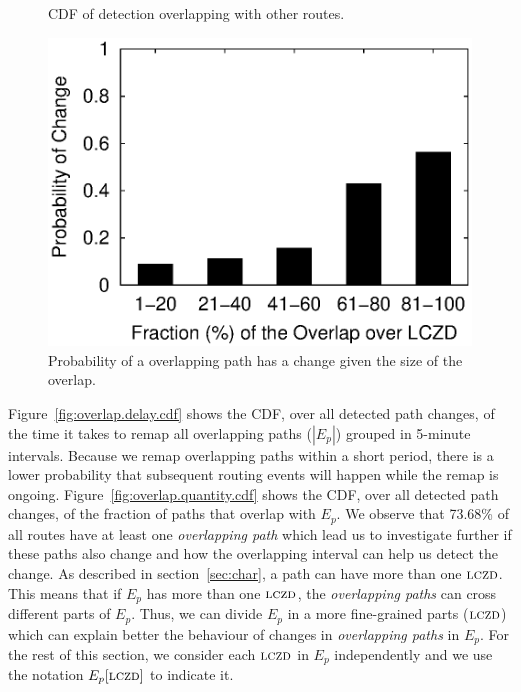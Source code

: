 \begin{figure}
\begin{minipage}{0.32\textwidth}
\caption{CDF of detection overlapping with other routes.}
\label{fig:overlap.quantity.cdf}
\end{minipage}
%
\hfill
\begin{minipage}{0.32\textwidth}
\includegraphics[width=1.05\columnwidth]{figs/patching/probchange/probchange.eps}
\caption{Probability of a overlapping path has a change given the size of the overlap.}
\label{fig:overlap.change.prob}
\end{minipage}
\end{figure}


Figure~\ref{fig:overlap.delay.cdf} shows the CDF, over all detected
path changes, of the time it takes to remap all
overlapping paths ($|E_p|$) grouped in 5-minute intervals.  
Because we remap overlapping paths within
a short period, there is a lower probability that subsequent routing
events will happen while the remap is ongoing. 
Figure~\ref{fig:overlap.quantity.cdf} shows the CDF, over all
detected path changes, of the fraction of paths that overlap with $E_p$.  
We observe that 73.68\% of all routes have at least one 
\emph{overlapping path} which lead us to investigate further if these
paths also change and how the overlapping interval can help us detect the change.
As described in section~\ref{sec:char}, a path can have more than one
$\mathrm{\textsc{lczd}}$. This means that if $E_p$ has more than one $\mathrm{\textsc{lczd}}$, the \emph{overlapping
paths} can cross different parts of $E_p$. Thus, we can divide $E_p$ in a more
fine-grained parts ($\mathrm{\textsc{lczd}}$) which can explain better the behaviour of changes in
\emph{overlapping paths} in $E_p$. For the rest of this section, we
consider each $\mathrm{\textsc{lczd}}$ in $E_p$ independently and we use the notation $E_p[\mathrm{\textsc{lczd}}]$ 
to indicate it. 

